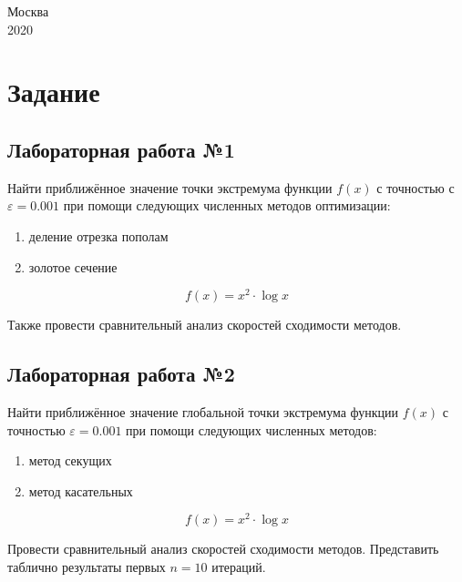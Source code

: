 \documentclass[a4paper,12pt]{extarticle}
\begin{document}
\begin{titlepage}
        \vspace{\fill}

        \begin{center}
            \large	Москва \\2020
        \end{center}

    \end{titlepage}

    \setcounter{page}{2}
    \tableofcontents
    \vspace{\baselineskip}

    \newpage
    \section{Задание}

    \subsection{Лабораторная работа №1}
    Найти приближённое значение точки экстремума функции $f(x)$ с точностью с
    $\varepsilon = 0.001$ при помощи следующих численных методов оптимизации:

    \begin{enumerate}
        \item деление отрезка пополам
        \item золотое сечение
    \end{enumerate}

    \[
        f(x) = x^2 \cdot \log x
    \]

    Также провести сравнительный анализ скоростей сходимости методов.

    \subsection{Лабораторная работа №2}
    Найти приближённое значение глобальной точки экстремума функции $f(x)$
    с точностью $\varepsilon = 0.001$ при помощи следующих численных методов:

    \begin{enumerate}
        \item метод секущих
        \item метод касательных
    \end{enumerate}

    \[
        f(x) = x^2 \cdot \log x
    \]

    Провести сравнительный анализ скоростей сходимости методов. Представить таблично результаты первых $n=10$ итераций.
\end{document}
